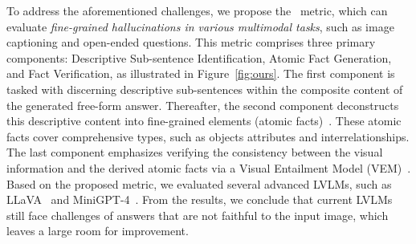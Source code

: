 



To address the aforementioned challenges, we propose the \ours\ metric, which can evaluate \textit{fine-grained hallucinations in various multimodal tasks}, such as image captioning and open-ended questions. This metric comprises three primary components: Descriptive Sub-sentence Identification, Atomic Fact Generation, and Fact Verification, as illustrated in Figure~\ref{fig:ours}. The first component is tasked with discerning descriptive sub-sentences within the composite content of the generated free-form answer. Thereafter, the second component deconstructs this descriptive content into fine-grained elements (\ie atomic facts)~\cite{factscore}. These atomic facts cover comprehensive types, such as objects attributes and interrelationships. The last component emphasizes verifying the consistency between the visual information and the derived atomic facts via a Visual Entailment Model (VEM)~\cite{DBLP:journals/corr/abs-1901-06706}. Based on the proposed metric, we evaluated several advanced LVLMs, such as LLaVA~\cite{llava} and MiniGPT-4~\cite{minigpt4}. From the results, we conclude that current LVLMs still face challenges of answers that are not faithful to the input image, which leaves a large room for improvement.

